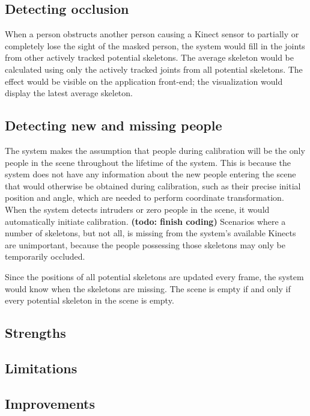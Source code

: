 \documentclass{sigchi}
\begin{document}
\subsection{Detecting occlusion}

When a person obstructs another person causing a Kinect sensor to partially or completely lose the sight of the masked person, the system would fill in the joints from other actively tracked potential skeletons. The average skeleton would be calculated using only the actively tracked joints from all potential skeletons. The effect would be visible on the application front-end; the visualization would display the latest average skeleton.

\subsection{Detecting new and missing people}

The system makes the assumption that people during calibration will be the only people in the scene throughout the lifetime of the system. This is because the system does not have any information about the new people entering the scene that would otherwise be obtained during calibration, such as their precise initial position and angle, which are needed to perform coordinate transformation. When the system detects intruders or zero people in the scene, it would automatically initiate calibration. \textbf{(todo: finish coding)} Scenarios where a number of skeletons, but not all, is missing from the system's available Kinects are unimportant, because the people possessing those skeletons may only be temporarily occluded.

Since the positions of all potential skeletons are updated every frame, the system would know when the skeletons are missing. The scene is empty if and only if every potential skeleton in the scene is empty.

\subsection{Strengths}

\subsection{Limitations}

\subsection{Improvements}
\end{document}
